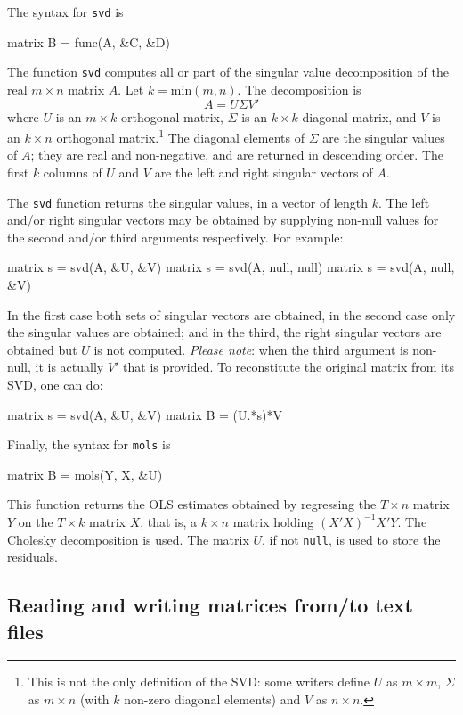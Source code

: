 The syntax for \texttt{svd} is
%
\begin{code}
matrix B = func(A, &C, &D)
\end{code}
%
The function \texttt{svd} computes all or part of the singular value
decomposition of the real $m \times n$ matrix $A$. Let $k =
\mbox{min}(m, n)$.  The decomposition is
\[
A = U \Sigma V'
\]
where $U$ is an $m \times k$ orthogonal matrix, $\Sigma$ is an $k
\times k$ diagonal matrix, and $V$ is an $k \times n$ orthogonal
matrix.\footnote{This is not the only definition of the SVD: some
  writers define $U$ as $m \times m$, $\Sigma$ as $m \times n$ (with
  $k$ non-zero diagonal elements) and $V$ as $n \times n$.} The
diagonal elements of $\Sigma$ are the singular values of $A$; they are
real and non-negative, and are returned in descending order.  The
first $k$ columns of $U$ and $V$ are the left and right singular
vectors of $A$.

The \texttt{svd} function returns the singular values, in a vector of
length $k$.  The left and/or right singular vectors may be obtained by
supplying non-null values for the second and/or third arguments
respectively.  For example:
%
\begin{code}
matrix s = svd(A, &U, &V)
matrix s = svd(A, null, null)
matrix s = svd(A, null, &V)
\end{code}
%
In the first case both sets of singular vectors are obtained, in the
second case only the singular values are obtained; and in the third,
the right singular vectors are obtained but $U$ is not computed.
\emph{Please note}: when the third argument is non-null, it is
actually $V'$ that is provided.  To reconstitute the original matrix
from its SVD, one can do:
%
\begin{code}
matrix s = svd(A, &U, &V)
matrix B = (U.*s)*V
\end{code}
%

Finally, the syntax for \texttt{mols} is
%
\begin{code}
matrix B = mols(Y, X, &U)
\end{code}
%
This function returns the OLS estimates obtained by regressing the $T
\times n$ matrix $Y$ on the $T \times k$ matrix $X$, that is, a $k
\times n$ matrix holding $(X'X)^{-1} X'Y$. The Cholesky decomposition
is used. The matrix $U$, if not \texttt{null}, is used to store the
residuals.

\subsection{Reading and writing matrices from/to text files}
\label{sec:matrix-csv}

